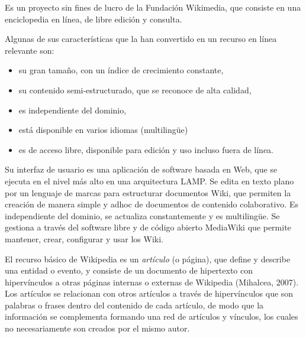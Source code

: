 \documentclass[letterpaper]{article}
\newcommand\textstylebibuscitbase[1]{#1}
\newcommand\liststyleLi{%
\renewcommand\labelitemi{{\textbullet}}
\renewcommand\labelitemii{${\circ}$}
\renewcommand\labelitemiii{${\blacksquare}$}
\renewcommand\labelitemiv{{\textbullet}}
}
\begin{document}
{\sffamily
Es un proyecto sin fines de lucro de la Fundaci\'on Wikimedia, que
consiste en una enciclopedia en l\'inea, de libre edici\'on y
consulta.}


\bigskip

{\sffamily
Algunas de sus caracter\'isticas que la han convertido en un recurso en
l\'inea relevante son:}


\bigskip

\liststyleLi
\begin{itemize}
\item {\sffamily
\textstylebibuscitbase{\foreignlanguage{spanish}{su gran tama\~no, con
un \'indice de crecimiento constante,}}}
\item {\sffamily
\textstylebibuscitbase{\foreignlanguage{spanish}{su contenido
semi-estructurado, que se reconoce de alta calidad,}}}
\item {\sffamily
\textstylebibuscitbase{\foreignlanguage{spanish}{es independiente del
dominio,}}}
\item {\sffamily
\textstylebibuscitbase{\foreignlanguage{spanish}{est\'a disponible en
varios idiomas (multiling\"ue)}}}
\item {\sffamily
\textstylebibuscitbase{\foreignlanguage{spanish}{es de acceso libre,
disponible para edici\'on y uso incluso fuera de l\'inea.}}}
\end{itemize}

\bigskip

{\sffamily
Su interfaz de usuario es una aplicaci\'on de software basada en Web,
que se ejecuta en el nivel m\'as alto en una arquitectura LAMP. Se
edita en texto plano por un lenguaje de marcas para estructurar
documentos Wiki, que permiten la creaci\'on de manera simple y adhoc de
documentos de contenido colaborativo. Es independiente del dominio, se
actualiza constantemente y es multiling\"ue. Se gestiona a trav\'es del
software libre y de c\'odigo abierto MediaWiki que permite mantener,
crear, configurar y usar los Wiki.}


\bigskip

{\sffamily
El recurso b\'asico de Wikipedia es un \textit{art\'iculo }(o p\'agina),
que define y describe una entidad o evento, y consiste de un documento
de hipertexto con hiperv\'inculos a otras p\'aginas internas o externas
de Wikipedia (Mihalcea, 2007)\textstylebibuscitbase{. Los art\'iculos
se relacionan con otros art\'iculos a trav\'es de hiperv\'inculos que
son palabras o frases dentro del contenido de cada art\'iculo, de modo
que la informaci\'on se complementa formando una red de art\'iculos y
v\'inculos, los cuales no necesariamente son creados por el mismo
autor.}}
\end{document}
